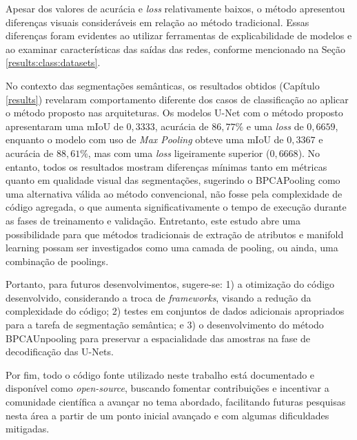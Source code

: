 Apesar dos valores de acurácia e \textit{loss} relativamente baixos, o método apresentou diferenças visuais consideráveis em relação ao método tradicional. Essas diferenças foram evidentes ao utilizar ferramentas de explicabilidade de modelos e ao examinar características das saídas das redes, conforme mencionado na Seção \ref{results:class:datasets}.

No contexto das segmentações semânticas, os resultados obtidos (Capítulo \ref{results}) revelaram comportamento diferente dos casos de classificação ao aplicar o método proposto nas arquiteturas. Os modelos U-Net com o método proposto apresentaram uma mIoU de $0,3333$, acurácia de $86,77\%$ e uma \textit{loss} de $0,6659$, enquanto o modelo com uso de \textit{Max Pooling} obteve uma mIoU de $0,3367$ e acurácia de $88,61\%$, mas com uma \textit{loss} ligeiramente superior ($0,6668$). No entanto, todos os resultados mostram diferenças mínimas tanto em métricas quanto em qualidade visual das segmentações, sugerindo o BPCAPooling como uma alternativa válida ao método convencional, não fosse pela complexidade de código agregada, o que aumenta significativamente o tempo de execução durante as fases de treinamento e validação. Entretanto, este estudo abre uma possibilidade para que métodos tradicionais de extração de atributos e manifold learning possam ser investigados como uma camada de pooling, ou ainda, uma combinação de poolings.

Portanto, para futuros desenvolvimentos, sugere-se: 1) a otimização do código desenvolvido, considerando a troca de \textit{frameworks}, visando a redução da complexidade do código; 2) testes em conjuntos de dados adicionais apropriados para a tarefa de segmentação semântica; e 3) o desenvolvimento do método BPCAUnpooling para preservar a espacialidade das amostras na fase de decodificação das U-Nets.

Por fim, todo o código fonte utilizado neste trabalho está documentado e disponível como \textit{open-source}, buscando fomentar contribuições e incentivar a comunidade científica a avançar no tema abordado, facilitando futuras pesquisas nesta área a partir de um ponto inicial avançado e com algumas dificuldades mitigadas.
